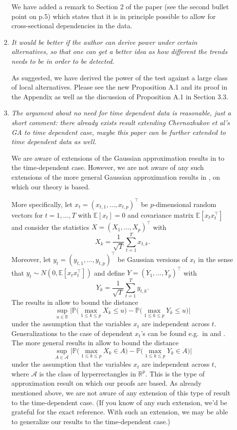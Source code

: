 \documentclass[a4paper,12pt]{article}
\begin{document}
\begin{enumerate}[label=(\arabic*),leftmargin=0.7cm]
\begin{enumerate}[label=(\alph*),leftmargin=0.7cm]
We have added a remark to Section 2 of the paper (see the second bullet point on p.5) which states that it is in principle possible to allow for cross-sectional dependencies in the data.


\item \textit{It would be better if the author can derive power under certain alternatives, so that one can get a better idea as how different the trends needs to be in order to be detected.}

As suggested, we have derived the power of the test against a large class of local alternatives. Please see the new Proposition A.1 and its proof in the Appendix as well as the discussion of Proposition A.1 in Section 3.3.


\item \textit{The argument about no need for time dependent data is reasonable, just a short comment: there already exists result extending Chernozhukov et al's GA to time dependent case, maybe this paper can be further extended to time dependent data as well.}

We are aware of extensions of the Gaussian approximation results in \cite{Chernozhukov2013} to the time-dependent case. However, we are not aware of any such extensions of the more general Gaussian approximation results in \cite{Chernozhukov2017}, on which our theory is based. 

More specifically, let $x_t = (x_{t,1},\ldots,x_{t,p})^\top$ be $p$-dimensional random vectors for $t=1,\ldots,T$ with $\mathbb{E}[x_t] = 0$ and covariance matrix $\mathbb{E}[x_t x_t^\top]$ and consider the statistics $X = (X_1,\ldots,X_p)^\top$ with
\[ X_k = \frac{1}{\sqrt{T}} \sum_{t=1}^T x_{t,k}. \]
Moreover, let $y_t = (y_{t,1},\ldots,y_{t,p})^\top$ be Gaussian versions of $x_t$ in the sense that $y_t \sim N(0,\mathbb{E}[x_t x_t^\top])$ and define $Y = (Y_1,\ldots,Y_p)^\top$ with
\[ Y_k = \frac{1}{\sqrt{T}} \sum_{t=1}^T y_{t,k}. \]
The results in \cite{Chernozhukov2013} allow to bound the distance
\[ \sup_{u \in \mathbb{R}} \Big| \mathbb{P} \Big( \max_{1 \le k \le p} X_k \le u \Big) - \mathbb{P} \Big( \max_{1 \le k \le p} Y_k \le u \Big) \Big| \]
under the assumption that the variables $x_t$ are independent across $t$. Generalizations to the case of dependent $x_t$'s can be found e.g.\ in \cite{ZhangWu2017} and \cite{ZhangCheng2018}. The more general results in \cite{Chernozhukov2017} allow to bound the distance 
\[ \sup_{A \in \mathcal{A}} \Big| \mathbb{P} \Big( \max_{1 \le k \le p} X_k \in A \Big) - \mathbb{P} \Big( \max_{1 \le k \le p} Y_k \in A \Big) \Big| \]
under the assumption that the variables $x_t$ are independent across $t$, where $\mathcal{A}$ is the class of hyperrectangles in $\mathbb{R}^p$. This is the type of approximation result on which our proofs are based. As already mentioned above, we are not aware of any extension of this type of result to the time-dependent case. (If you know of any such extension, we'd be grateful for the exact reference. With such an extension, we may be able to generalize our results to the time-dependent case.) 
\end{enumerate}



\end{enumerate}
\end{document}
